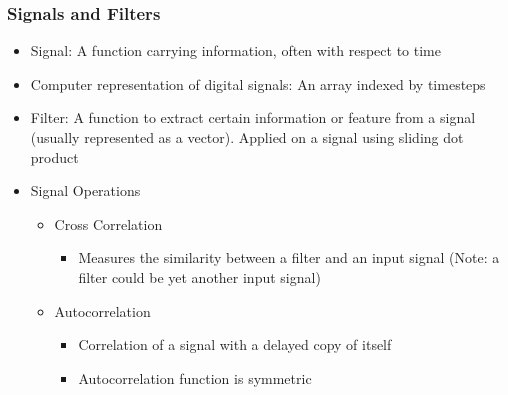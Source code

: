 \documentclass[aspectratio=169]{beamer}
\begin{document}
\begin{frame}
\frametitle{Signals and Filters}
\begin{itemize}
    \item Signal: A function carrying information, often with respect to time
    \item Computer representation of digital signals: An array indexed by timesteps
    \item Filter: A function to extract certain information or feature from a signal (usually represented as a vector). Applied on a signal using sliding dot product
    \item Signal Operations
        \begin{itemize}
        \item Cross Correlation
        \begin{itemize}
            \item Measures the similarity between a filter and an input signal (Note: a filter could be yet another input signal)
        \end{itemize}
        \item Autocorrelation
        \begin{itemize}
            \item Correlation of a signal with a delayed copy of itself
            \item Autocorrelation function is symmetric
        \end{itemize}
    \end{itemize}
\end{itemize}
\end{frame}
\end{document}
